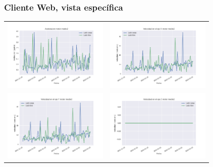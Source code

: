 \documentclass{beamer}
\begin{document}
\begin{frame}
    \frametitle{Cliente Web, vista específica}
     \begin{table}[H]
        \begin{center}
            \begin{tabular}{p{5cm}p{5cm}}

            \includegraphics[width=5cm]{../images/diapositivas/clients/as_medio2.png}&
            \includegraphics[width=5cm]{../images/diapositivas/clients/vxs_medio2.png}\\
            \includegraphics[width=5cm]{../images/diapositivas/clients/vys_medio2.png}&
            \includegraphics[width=5cm]{../images/diapositivas/clients/vzs_medio2.png}\\

            \end{tabular}
        \end{center}
    \end{table}
\end{frame}
\end{document}
